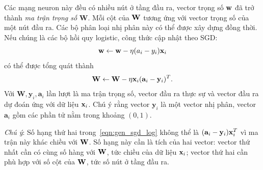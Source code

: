 Các mạng neuron này đều có nhiều nút ở tầng đầu ra, vector trọng số
$\mathbf{w}$ đã trở thành \textit{ma trận trọng số} $\mathbf{W}$. Mỗi
cột của $\mathbf{W}$ tương ứng với vector trọng số của một nút đầu ra. Các bộ phân loại nhị phân này có thể được xây dựng đồng thời. Nếu chúng là các bộ hồi quy logistic, công thức cập nhật theo SGD:
\begin{equation}
\mathbf{w} \leftarrow \mathbf{w} - \eta(a_i - y_i)\mathbf{x}_i
\end{equation}
có thể được tổng quát thành
\begin{equation}
\label{eqn:gen_sgd_log}
\mathbf{W} \leftarrow \mathbf{W} - \eta\mathbf{x}_i(\mathbf{a}_i - \mathbf{y}_i)^T.
\end{equation}
Với $\mathbf{W}, \mathbf{y}_i, \mathbf{a}_i$ lần lượt là ma trận trọng số,
vector đầu ra thực sự và vector đầu ra dự đoán ứng với dữ liệu $\mathbf{x}_i$. Chú ý
rằng vector $\mathbf{y}_i$ là một vector nhị phân, vector $\mathbf{a}_i$ gồm các
phần tử nằm trong khoảng $(0, 1)$.


\textit{Chú ý}: Số hạng thứ hai trong~\eqref{eqn:gen_sgd_log} không thể là $(\mathbf{a}_i - \mathbf{y}_i)\mathbf{x}_i^T$ vì ma trận này khác chiều với $\mathbf{W}$. Số hạng này cần là tích của hai vector: vector thứ nhất cần có cùng số hàng với $\mathbf{W}$, tức chiều của dữ liệu $\mathbf{x}_i$; vector thứ hai cần phù hợp với số cột của $\mathbf{W}$, tức số nút ở tầng đầu ra.







